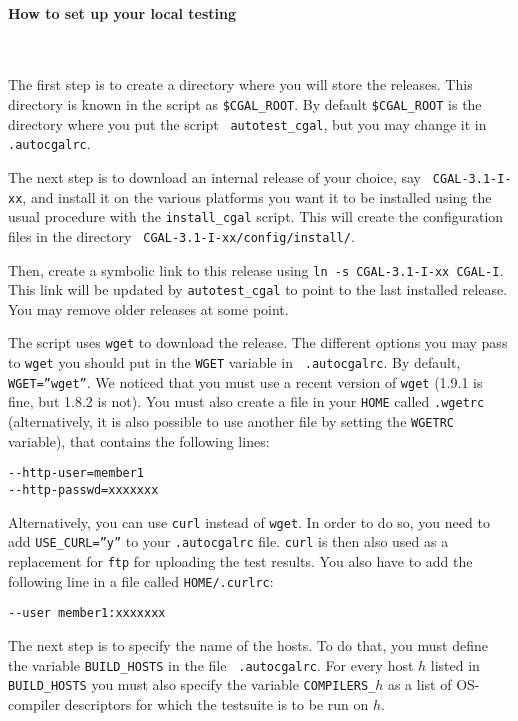 \paragraph{How to set up your local testing} ~

The first step is to create a directory where you will store the releases.
This directory is known in the script as {\tt \$CGAL\_ROOT}. By default
{\tt \$CGAL\_ROOT} is the directory where you put the script {\tt
autotest\_cgal}, but you may change it in {\tt .autocgalrc}.

The next step is to download an internal release of your choice, say {\tt
CGAL-3.1-I-xx}, and install it on the various platforms you want it to be
installed using the usual procedure with the {\tt install\_cgal} script.
This will create the configuration files in the directory {\tt
CGAL-3.1-I-xx/config/install/}.

Then, create a symbolic link to this release using {\tt ln -s CGAL-3.1-I-xx
CGAL-I}. This link will be updated by {\tt autotest\_cgal} to point to the
last installed release.  You may remove older releases at some point.

The script uses {\tt wget} to download the release. The different options you
may pass to {\tt wget} you should put in the {\tt WGET} variable in {\tt
.autocgalrc}. By default, {\tt WGET=''wget''}. We noticed that you must use
a recent version of {\tt wget} (1.9.1 is fine, but 1.8.2 is not). You must
also create a file in your {\tt HOME} called {\tt .wgetrc} (alternatively,
it is also possible to use another file by setting the {\tt WGETRC} variable),
that contains the following lines:
\begin{verbatim}
--http-user=member1
--http-passwd=xxxxxxx
\end{verbatim}

Alternatively, you can use {\tt curl} instead of {\tt wget}.  In order to
do so, you need to add {\tt USE\_CURL=''y''} to your {\tt .autocgalrc} file.
{\tt curl} is then also used as a replacement for {\tt ftp} for uploading the
test results.
You also have to add the following line in a file called {\tt HOME/.curlrc}:
\begin{verbatim}
--user member1:xxxxxxx
\end{verbatim}

The next step is to specify the name of the hosts. To do that, you
must define the variable \texttt{BUILD\_HOSTS} in the file {\tt
  .autocgalrc}. For every host $h$ listed in \texttt{BUILD\_HOSTS} you
must also specify the variable \texttt{COMPILERS\_$h$} as a list of
OS-compiler descriptors for which the testsuite is to be run on $h$.

